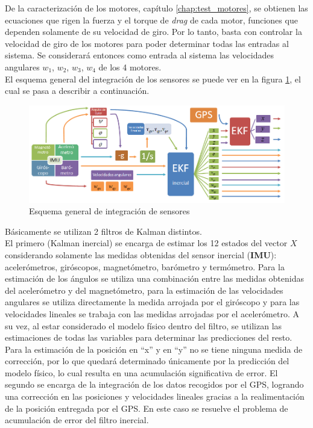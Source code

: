 \documentclass[main]{subfiles}
\begin{document}
De la caracterización de los motores, capítulo \ref{chap:test_motores}, se obtienen las ecuaciones que rigen la fuerza y el torque de \emph{drag} de cada motor, funciones que dependen solamente de su velocidad de giro. Por lo tanto, basta con controlar la velocidad de giro de los motores para poder determinar todas las entradas al sistema. Se considerará entonces como entrada al sistema las velocidades angulares $w_1$, $w_2$, $w_3$, $w_4$ de los 4 motores.\\

El esquema general del integración de los sensores se puede ver en la figura \ref{fig:diagrama_kalman}, el cual se pasa a describir a continuación.

\begin{figure}[h!]
	\centering
	\includegraphics[width=1\textwidth]{./pics_kalman/diagrama_kalman.png}
	\caption{Esquema general de integración de sensores}
	\label{fig:diagrama_kalman}
\end{figure}

Básicamente se utilizan 2 filtros de Kalman distintos.\\
El primero (Kalman inercial) se encarga de estimar los 12 estados del vector $X$ considerando solamente las medidas obtenidas del sensor inercial (\textbf{IMU}): acelerómetros, giróscopos, magnetómetro, barómetro y termómetro. Para la estimación de los ángulos se utiliza una combinación entre las medidas obtenidas del acelerómetro y del magnetómetro, para la estimación de las velocidades angulares se utiliza directamente la medida arrojada por el giróscopo y para las velocidades lineales se trabaja con las medidas arrojadas por el acelerómetro. A su vez, al estar considerado el modelo físico dentro del filtro, se utilizan las estimaciones de todas las variables para determinar las predicciones del resto. Para la estimación de la posición en ``x'' y en ``y'' no se tiene ninguna medida de corrección, por lo que quedará determinado únicamente por la predicción del modelo físico, lo cual resulta en una acumulación significativa de error.
El segundo se encarga de la integración de los datos recogidos por el GPS, logrando una corrección en las posiciones y velocidades lineales gracias a la realimentación de la posición entregada por el GPS. En este caso se resuelve el problema de acumulación de error del filtro inercial.\\
\end{document}
